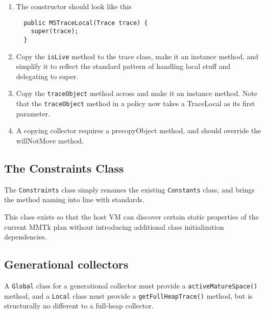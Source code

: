 \documentclass[10pt]{article}
\newcommand{\code}[1]{\lstinline!#1!}
\begin{document}
\begin{enumerate}
\item The constructor should look like this
\begin{lstlisting}
  public MSTraceLocal(Trace trace) {
    super(trace);
  }
\end{lstlisting}

\item Copy the \code{isLive} method to the trace class, make it an
  instance method, and simplify it to reflect the standard pattern of
  handling local stuff and delegating to super.  

\item Copy the \code{traceObject} method across and make it an
  instance method.  Note that the \code{traceObject} method in a
  policy now takes a TraceLocal as its first parameter.

\item A copying collector requires a precopyObject method, and should
  override the willNotMove method.

\end{enumerate}

\subsection{The Constraints Class}

The \code{Constraints} class simply renames the existing
\code{Constants} class, and brings the method naming into line with
standards.  

This class exists so that the host VM can discover certain static
properties of the current MMTk plan without introducing additional
class initialization dependencies.

\subsection{Generational collectors}

A \code{Global} class for a generational collector must provide a
\code{activeMatureSpace()} method, and a \code{Local} class must
provide a \code{getFullHeapTrace()} method, but is structurally no
different to a full-heap collector.

 
\end{document}
